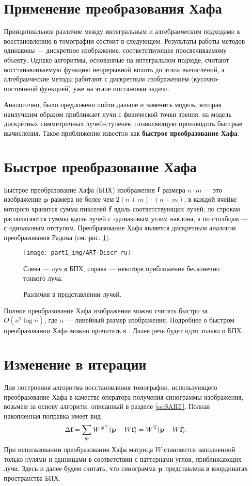 \section{Применение преобразования Хафа}
Принципиальное различие между интегральным и алгебраическим подходами к восстановлению в томографии состоит в следующем.
Результаты работы методов одинаковы --- дискретное изображение, соответствующее просвечиваемому объекту.
Однако алгоритмы, основанные на интегральном подходе, считают восстанавливаемую функцию непрерывной вплоть до этапа вычислений, а алгебраические методы работают с дискретным изображением (кусочно-постоянной функцией) уже на этапе постановки задачи.

Аналогично, было предложено пойти дальше и заменить модель, которая наилучшим образом приближает лучи с физической точки зрения, на модель дискретных симметричных лучей-ступенек, позволяющую производить быстрые вычисления.
Такое приближение известно как \textbf{быстрое преобразование Хафа}.

\section{Быстрое преобразование Хафа}
Быстрое преобразование Хафа (БПХ) изображения $\textbf f$ размера $n \cdot  m$ --- это изображение $\textbf p$ размера не более чем $2(n+m) \cdot (n+m)$, в каждой ячейке которого хранится сумма пикселей $\textbf f$ вдоль соответствующих лучей; по строкам располагаются суммы вдоль лучей с одинаковым углом наклона, а по столбцам --- с одинаковым отступом.
Преобразование Хафа является дискретным аналогом преобразования Радона (см. рис. \ref{fig:hough_radon}).

\begin{figure}[h!]
  \centering
    \texttt{[image: part1\_img/ART-Discr-ru]}
 \caption{Различия в представлении лучей.}
Слева --- луч в БПХ, справа --- некоторе приближение бесконечно тонкого луча.
\label{fig:hough_radon}
\end{figure}

Полное преобразование Хафа изображения можно считать быстро за $O(n^2\log n)$, где $n$ --- линейный размер изображения.
Подробнее о быстром преобразовании Хафа можно прочитать в \cite{hough}.
Далее речь будет идти только о БПХ.

\section{Изменение в итерации}
Для построения алгоритма восстановления томографии, использующего преобразование Хафа в качестве оператора получения синограммы изображения, возьмем за основу алгоритм, описанный в разделе \ref{ss:SART}.
Полная накопленная поправка имеет вид
\begin{equation}
\label{eq:sum}
\Delta \textbf f = \sum_\varphi {{W^\varphi}^{\mathrm T}(\textbf p - W\textbf f) } = W^{\mathrm T}(\textbf p - W \textbf f).
\end{equation}
При использовании преобразования Хафа матрица $W$ становится заполненной только нулями и единицами в соответствии с паттернами углов, приближающих лучи.
Здесь и далее будем считать, что синограмма $\textbf p$ представлена в координатах пространства БПХ.

